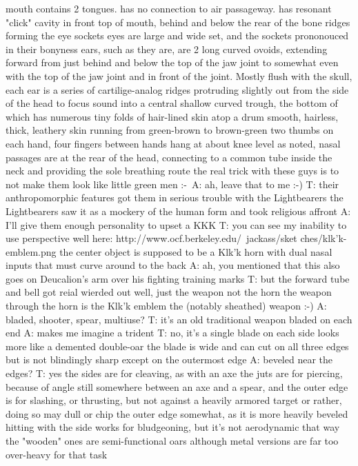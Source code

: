 mouth contains 2 tongues. has no connection to air passageway. has resonant "click" cavity in front top of mouth, behind and below the rear of the bone ridges forming the eye sockets
eyes are large and wide set, and the sockets prononouced in their bonyness
ears, such as they are, are 2 long curved ovoids, extending forward from just behind and below the top of the jaw joint to somewhat even with the top of the jaw joint and in front of the joint. Mostly flush with the skull, each ear is a series of cartilige-analog ridges protruding slightly out from the side of the head to focus sound into a central shallow curved trough, the bottom of which has numerous tiny folds of hair-lined skin atop a drum
smooth, hairless, thick, leathery skin
running from green-brown to brown-green
two thumbs on each hand, four fingers between
hands hang at about knee level
 as noted, nasal passages are at the rear of the head, connecting to a common tube inside the neck and providing the sole breathing route
the real trick with these guys is to not make them look like little green men :-\
A: ah, leave that to me
:-)
T: their anthropomorphic features got them in serious trouble with the Lightbearers
the Lightbearers saw it as a mockery of the human form and took religious affront
A: I'll give them enough personality to upset a KKK
T: you can see my inability to use perspective well here: http://www.ocf.berkeley.edu/~jackass/sket ches/klk'k-emblem.png
the center object is supposed to be a Klk'k horn
with dual nasal inputs that must curve around to the back
A: ah, you mentioned that this also goes on Deucalion's arm over his fighting training marks
T: but the forward tube and bell got reial wierded out
well, just the weapon
not the horn
the weapon through the horn is the Klk'k emblem
 the (notably sheathed) weapon :-)
A: bladed, shooter, spear, multiuse?
T: it's an old traditional weapon
bladed on each end
A: makes me imagine a trident
T: no, it's a single blade on each side
looks more like a demented double-oar
the blade is wide and can cut on all three edges
but is not blindingly sharp
except on the outermost edge
A: beveled near the edges?
T: yes
the sides are for cleaving, as with an axe
the juts are for piercing, because of angle still somewhere between an axe and a spear, and the outer edge is for slashing, or thrusting, but not against a heavily armored target
or rather, doing so may dull or chip the outer edge somewhat, as it is more heavily beveled
hitting with the side works for bludgeoning, but it's not aerodynamic that way
the "wooden" ones are semi-functional oars
although metal versions are far too over-heavy for that task
